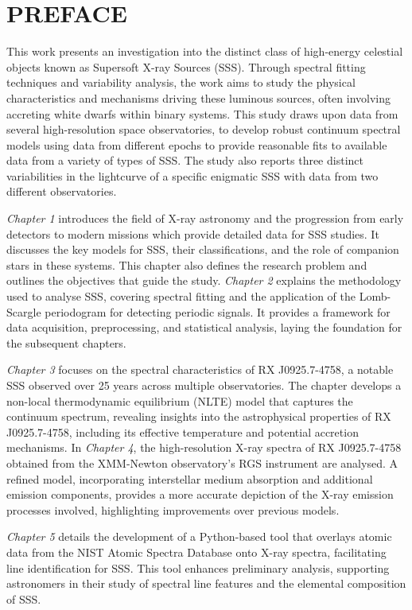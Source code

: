 \chapter*{PREFACE}
    \def\baselinestretch{1.0}
    This work presents an investigation into the distinct class of high-energy celestial objects known as Supersoft X-ray Sources (SSS). Through spectral fitting techniques and variability analysis, the work aims to study the physical characteristics and mechanisms driving these luminous sources, often involving accreting white dwarfs within binary systems. This study draws upon data from several high-resolution space observatories, to develop robust continuum spectral models using data from different epochs to provide reasonable fits to available data from a variety of types of SSS. The study also reports three distinct variabilities in the lightcurve of a specific enigmatic SSS with data from two different observatories.
    
    \textit{Chapter 1} introduces the field of X-ray astronomy and the progression from early detectors to modern missions which provide detailed data for SSS studies. It discusses the key models for SSS, their classifications, and the role of companion stars in these systems. This chapter also defines the research problem and outlines the objectives that guide the study. \textit{Chapter 2} explains the methodology used to analyse SSS, covering spectral fitting and the application of the Lomb-Scargle periodogram for detecting periodic signals. It provides a framework for data acquisition, preprocessing, and statistical analysis, laying the foundation for the subsequent chapters.
    
    \textit{Chapter 3} focuses on the spectral characteristics of RX J0925.7-4758, a notable SSS observed over 25 years across multiple observatories. The chapter develops a non-local thermodynamic equilibrium (NLTE) model that captures the continuum spectrum, revealing insights into the astrophysical properties of RX J0925.7-4758, including its effective temperature and potential accretion mechanisms. In \textit{Chapter 4}, the high-resolution X-ray spectra of RX J0925.7-4758 obtained from the XMM-Newton observatory's RGS instrument are analysed. A refined model, incorporating interstellar medium absorption and additional emission components, provides a more accurate depiction of the X-ray emission processes involved, highlighting improvements over previous models.
    
    \textit{Chapter 5} details the development of a Python-based tool that overlays atomic data from the NIST Atomic Spectra Database onto X-ray spectra, facilitating line identification for SSS. This tool enhances preliminary analysis, supporting astronomers in their study of spectral line features and the elemental composition of SSS.
    
